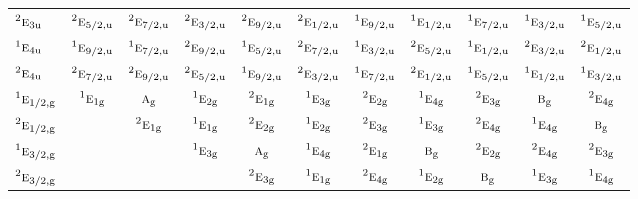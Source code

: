 \documentclass[10pt,a4paper]{article}
\numberwithin{equation}{section}
\newcommand{\irr}[1]{\text{\normalfont\scshape #1}}
\newcommand{\conjpair}[1]{{}^{#1}}
\newcommand{\ptag}[1]{\mathrm{#1}}
\begin{document}
{\begin{longtable}{@{}lcccccccccc@{}}
$\conjpair{2}\irr{e}_{3\ptag{u}}$ & $\conjpair{2}\irr{e}_{5/2,\ptag{u}}$ & $\conjpair{2}\irr{e}_{7/2,\ptag{u}}$ & $\conjpair{2}\irr{e}_{3/2,\ptag{u}}$ & $\conjpair{2}\irr{e}_{9/2,\ptag{u}}$ & $\conjpair{2}\irr{e}_{1/2,\ptag{u}}$ & $\conjpair{1}\irr{e}_{9/2,\ptag{u}}$ & $\conjpair{1}\irr{e}_{1/2,\ptag{u}}$ & $\conjpair{1}\irr{e}_{7/2,\ptag{u}}$ & $\conjpair{1}\irr{e}_{3/2,\ptag{u}}$ & $\conjpair{1}\irr{e}_{5/2,\ptag{u}}$\\
$\conjpair{1}\irr{e}_{4\ptag{u}}$ & $\conjpair{1}\irr{e}_{9/2,\ptag{u}}$ & $\conjpair{1}\irr{e}_{7/2,\ptag{u}}$ & $\conjpair{2}\irr{e}_{9/2,\ptag{u}}$ & $\conjpair{1}\irr{e}_{5/2,\ptag{u}}$ & $\conjpair{2}\irr{e}_{7/2,\ptag{u}}$ & $\conjpair{1}\irr{e}_{3/2,\ptag{u}}$ & $\conjpair{2}\irr{e}_{5/2,\ptag{u}}$ & $\conjpair{1}\irr{e}_{1/2,\ptag{u}}$ & $\conjpair{2}\irr{e}_{3/2,\ptag{u}}$ & $\conjpair{2}\irr{e}_{1/2,\ptag{u}}$\\
$\conjpair{2}\irr{e}_{4\ptag{u}}$ & $\conjpair{2}\irr{e}_{7/2,\ptag{u}}$ & $\conjpair{2}\irr{e}_{9/2,\ptag{u}}$ & $\conjpair{2}\irr{e}_{5/2,\ptag{u}}$ & $\conjpair{1}\irr{e}_{9/2,\ptag{u}}$ & $\conjpair{2}\irr{e}_{3/2,\ptag{u}}$ & $\conjpair{1}\irr{e}_{7/2,\ptag{u}}$ & $\conjpair{2}\irr{e}_{1/2,\ptag{u}}$ & $\conjpair{1}\irr{e}_{5/2,\ptag{u}}$ & $\conjpair{1}\irr{e}_{1/2,\ptag{u}}$ & $\conjpair{1}\irr{e}_{3/2,\ptag{u}}$\\
$\conjpair{1}\irr{e}_{1/2,\ptag{g}}$ & $\conjpair{1}\irr{e}_{1\ptag{g}}$ & $\irr{a}_{\ptag{g}}$ & $\conjpair{1}\irr{e}_{2\ptag{g}}$ & $\conjpair{2}\irr{e}_{1\ptag{g}}$ & $\conjpair{1}\irr{e}_{3\ptag{g}}$ & $\conjpair{2}\irr{e}_{2\ptag{g}}$ & $\conjpair{1}\irr{e}_{4\ptag{g}}$ & $\conjpair{2}\irr{e}_{3\ptag{g}}$ & $\irr{b}_{\ptag{g}}$ & $\conjpair{2}\irr{e}_{4\ptag{g}}$\\
$\conjpair{2}\irr{e}_{1/2,\ptag{g}}$ &  & $\conjpair{2}\irr{e}_{1\ptag{g}}$ & $\conjpair{1}\irr{e}_{1\ptag{g}}$ & $\conjpair{2}\irr{e}_{2\ptag{g}}$ & $\conjpair{1}\irr{e}_{2\ptag{g}}$ & $\conjpair{2}\irr{e}_{3\ptag{g}}$ & $\conjpair{1}\irr{e}_{3\ptag{g}}$ & $\conjpair{2}\irr{e}_{4\ptag{g}}$ & $\conjpair{1}\irr{e}_{4\ptag{g}}$ & $\irr{b}_{\ptag{g}}$\\
$\conjpair{1}\irr{e}_{3/2,\ptag{g}}$ &  &  & $\conjpair{1}\irr{e}_{3\ptag{g}}$ & $\irr{a}_{\ptag{g}}$ & $\conjpair{1}\irr{e}_{4\ptag{g}}$ & $\conjpair{2}\irr{e}_{1\ptag{g}}$ & $\irr{b}_{\ptag{g}}$ & $\conjpair{2}\irr{e}_{2\ptag{g}}$ & $\conjpair{2}\irr{e}_{4\ptag{g}}$ & $\conjpair{2}\irr{e}_{3\ptag{g}}$\\
$\conjpair{2}\irr{e}_{3/2,\ptag{g}}$ &  &  &  & $\conjpair{2}\irr{e}_{3\ptag{g}}$ & $\conjpair{1}\irr{e}_{1\ptag{g}}$ & $\conjpair{2}\irr{e}_{4\ptag{g}}$ & $\conjpair{1}\irr{e}_{2\ptag{g}}$ & $\irr{b}_{\ptag{g}}$ & $\conjpair{1}\irr{e}_{3\ptag{g}}$ & $\conjpair{1}\irr{e}_{4\ptag{g}}$\\

\end{longtable}}
\end{document}
